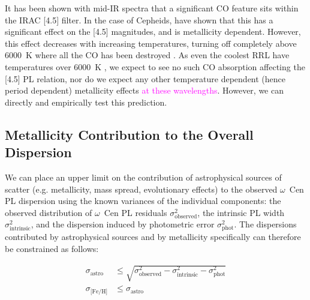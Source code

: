 \documentclass[a4paper,fleqn,usenatbib]{mnras}
\newcommand{\ocen}{$\omega$~Cen\xspace}
\begin{document}
It has been shown with mid-IR spectra that a significant CO feature sits within the IRAC [4.5] filter. In the case of Cepheids, \citet{2016MNRAS.459.1170S} have shown that this has a significant effect on the [4.5] magnitudes, and is metallicity dependent. However, this effect decreases with increasing temperatures, turning off completely above 6000~K where all the CO has been destroyed \citep{2016MNRAS.459.1170S}. As even the coolest RRL have temperatures over 6000~K \citep{1971PASP...83..697I}, we expect to see no such CO absorption affecting the [4.5] PL relation, nor do we expect any other temperature dependent (hence period dependent) metallicity effects \textcolor{magenta}{at these wavelengths}. However, we can directly and empirically test this prediction. %

\subsection{Metallicity Contribution to the Overall Dispersion}
\label{sec:dispersions}

We can place an upper limit on the contribution of astrophysical sources of scatter (e.g. metallicity, mass spread, evolutionary effects) to the observed \ocen PL dispersion using the known variances of the individual components: the observed distribution of \ocen PL residuals $\sigma_{\text{observed}}^2$, the intrinsic PL width $\sigma_{\text{intrinsic}}^2$, and the dispersion induced by photometric error $\sigma_{\text{phot}}^2$. The dispersions contributed by astrophysical sources and by metallicity specifically can therefore be constrained as follows:

\begin{align}
\sigma_\text{astro} &\leq \sqrt{\sigma_{\text{observed}}^2 - \sigma_{\text{intrinsic}}^2 - \sigma_{\text{phot}}^2} \\
\sigma_{\text{[Fe/H]}} &\leq \sigma_\text{astro}
\end{align}


\end{document}
